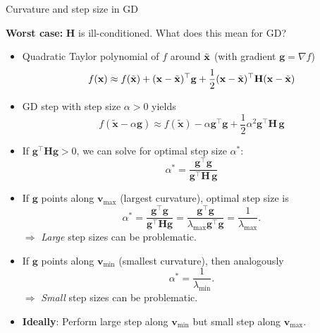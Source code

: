 \documentclass[11pt,compress,t,notes=noshow, xcolor=table]{beamer}
\begin{document}

\begin{vbframe}{Curvature and step size in GD}
	
\textbf{Worst case:} $\mathbf{H}$ is ill-conditioned.
What does this mean for GD?

\begin{itemize}
    \item Quadratic Taylor polynomial of $f$ around $\tilde{\mathbf{x}}$ (with gradient $\mathbf{g} = \nabla f$)
    $$
        f(\mathbf{x}) \approx f(\tilde{\mathbf{x}}) + (\mathbf{x} - \tilde{\mathbf{x}})^\top \mathbf{g} + \frac{1}{2} (\mathbf{x} - \tilde{\mathbf{x}})^\top \mathbf{H} (\mathbf{x} - \tilde{\mathbf{x}})
    $$
    \item GD step with step size $\alpha > 0$ yields
    $$
        f(\bm{\tilde{x}}-\alpha \mathbf{g}) \approx f(\bm{\tilde{x}}) - \alpha \mathbf{g}^\top\mathbf{g} + \frac{1}{2}	\alpha^2 \mathbf{g}^\top \bm{H}\,\mathbf{g}
    $$ 

    \item If $\mathbf{g}^\top \bm{H} \mathbf{g} > 0$, we can solve for optimal step size $\alpha^\ast$:
    $$
        \alpha^\ast = \frac{\mathbf{g}^\top \mathbf{g}}{\mathbf{g}^\top \bm{H}\, \mathbf{g}}
    $$
\end{itemize}

\framebreak 

\begin{itemize}
    \setlength{\itemsep}{1em}
    \item If $\mathbf{g}$ points along $\mathbf{v}_{\text{max}}$ (largest curvature), optimal step size is
    $$
        \alpha^\ast = \frac{\mathbf{g}^\top \mathbf{g}}{\mathbf{g}^\top \mathbf{H} \mathbf{g}} = \frac{\mathbf{g}^\top \mathbf{g}}{\lambda_{\text{max}} \mathbf{g}^\top \mathbf{g}} = \frac{1}{\lambda_{\text{max}}}.
    $$ 
    $\Rightarrow$ \textit{Large} step sizes can be problematic.
    \item If $\mathbf{g}$ points along $\mathbf{v}_{\text{min}}$ (smallest curvature), then analogously
    $$
        \alpha^* = \frac{1}{\lambda_{\text{min}}}.
    $$
    $\Rightarrow$ \textit{Small} step sizes can be problematic.
    \item \textbf{Ideally}: Perform large step along $\mathbf{v}_\text{min}$ but small step along $\mathbf{v}_\text{max}$.
\end{itemize}
    
\framebreak


\end{vbframe}
\end{document}
